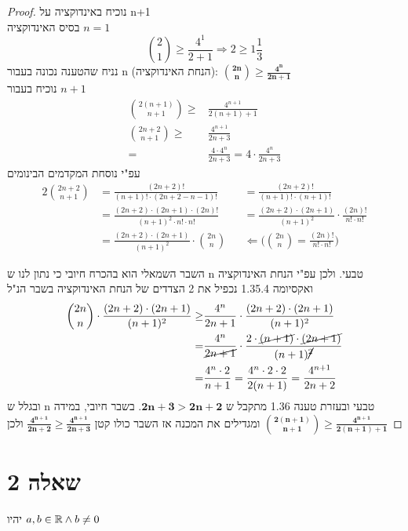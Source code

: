 \documentclass{article}
\begin{document}
	 \begin{proof}
		\nl
		נוכיח באינדוקציה על n+1 \\
		בסיס האינדוקציה
		$n = 1$
		\[
			{2 \choose 1} \geq \frac{4^1}{2+1} \Rightarrow 2 \geq 1 \frac{1}{3}
		\]
נניח שהטענה נכונה בעבור n (הנחת האינדוקציה):
		$\bm{{2n \choose n} \geq \frac{4^n}{2n+1}}$ \\
נוכיח בעבור $n + 1$
		\begin{align*}
			{2(n+1) \choose n+1} \geq &\frac{4^{n+1}}{2(n+1)+1} \\[1em]
			{2n + 2 \choose n + 1} \geq &\frac{4^{n+1}}{2n + 3} \\[1em]
			=&\frac{4 \cdot 4^n}{2n+3}
			=4 \cdot \frac{4^n}{2n+3}
		\end{align*}
עפ"י נוסחת המקדמים הבינומים
		\begin{alignat*}{2}
			{2n + 2 \choose n + 1} &=
			\frac{(2n+2)!}{(n+1)! \cdot (2n+2-n-1)!}
			&&=\frac{(2n+2)!}{(n+1)! \cdot (n+1)!} \\[1em]
			&=\frac{(2n+2) \cdot (2n+1) \cdot (2n)!}{(n+1)^2 \cdot n! \cdot n!}
			&&=\frac{(2n+2) \cdot (2n+1)}{(n+1)^2} \cdot \frac{(2n)!}{n! \cdot n!} \\[1em]
			&=\frac{(2n+2) \cdot (2n+1)}{(n+1)^2} \cdot {2n \choose n}
			&& \Leftarrow \bigg( {2n \choose n} = \frac{(2n)!}{n! \cdot n!} \bigg)
		\end{alignat*}

		השבר השמאלי הוא בהכרח חיובי כי נתון לנו ש n טבעי.
ולכן עפ"י הנחת האינדוקציה ואקסיומה 1.35.4 נכפיל את 2 הצדדים של הנחת האינדוקציה בשבר הנ"ל
		\begin{align*}
			{2n \choose n} \cdot \frac{(2n+2) \cdot (2n+1)}{(n+1)^2} \geq
			&\frac{4^n}{2n+1} \cdot \frac{(2n+2) \cdot (2n+1)}{(n+1)^2} \\
			=&\frac{4^n}{\cancel{2n+1}} \cdot \frac{2 \cdot \cancel{(n+1)} \cdot \cancel{(2n+1)}}{(n+1)\cancel{^2}} \\
			=&\frac{4^n \cdot 2}{n+1}
			=\frac{4^n \cdot 2 \cdot 2}{2(n+1)} =
			\frac{4^{n+1}}{2n+2}
		\end{align*}
		ובגלל ש n טבעי ובעזרת טענה 1.36 מתקבל ש
		$\bm{2n + 3 > 2n + 2}$.
		בשבר חיובי,
		במידה ומגדילים את המכנה אז השבר כולו קטן
		$\bm{\frac{4^{n+1}}{2n+2} \geq \frac{4^{n+1}}{2n+3}}$
		ולכן
		$\bm{{2(n+1) \choose n+1} \geq \frac{4^{n+1}}{2(n+1)+1}}$
	\end{proof}

	\pagebreak
	\section*{שאלה 2}
	יהיו
	$\displaystyle{a,b \in \mathbb{R}\land b \neq 0}$
\end{document}
